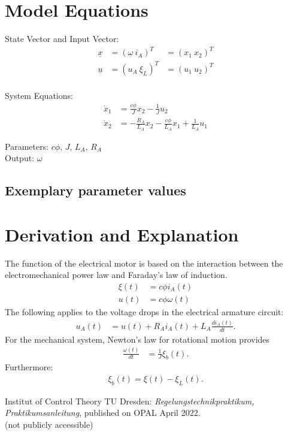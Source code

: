 \documentclass[10pt,a4paper]{article}
\begin{document}
	
	\section{Model Equations} %
	
	State Vector and Input Vector:
	\begin{align*}
		\underline{x} &= (\omega \ i_A)^T &= (x_1 \ x_2)^T \\
		\underline{u} &= (u_A \ \xi_L)^T &= (u_1 \ u_2)^T \\
	\end{align*}
	
	\noindent System Equations:			
	\begin{subequations}
	\begin{align}
		\dot{x}_1 &= \frac{c\phi}{J}x_2 - \frac{1}{J}u_2 \\
		\dot{x}_2 &= -\frac{R_A}{L_A}x_2 - \frac{c\phi}{L_A}x_1 + \frac{1}{L_A}u_1
	\end{align}
	\end{subequations}

	\noindent
	Parameters: $c\phi, \, J, \, L_A, \, R_A$%
	\\
	Output: $\omega$ \\ %
	

	
	\subsection{Exemplary parameter values}
	

	
	\section{Derivation and Explanation} %
	The function of the electrical motor is based on the interaction between the electromechanical power law and Faraday's law of induction.
	\begin{align}
		\xi (t) &= c\phi i_A(t) \\
		u(t) &= c\phi \omega(t)
	\end{align}
	The following applies to the voltage drops in the electrical armature circuit: 
	\begin{align}
		u_A(t) &= u(t) + R_A i_A(t) + L_A\frac{di_A(t)}{dt}. 
	\end{align}
	For the mechanical system, Newton's law for rotational motion provides
	\begin{align}
		\frac{\omega(t)}{dt} &= \frac{1}{J}\xi_b(t). 
	\end{align}
	Furthermore: 
	\begin{align}
		\xi_b(t) = \xi(t) - \xi_L(t). 
	\end{align}
	
	\begin{thebibliography}{10}		
		Institut of Control Theory TU Dresden: 
		\textit{Regelungstechnikpraktikum, Praktikumsanleitung}, published on OPAL April 2022. \\
		(not publicly accessible)
	\end{thebibliography}
\end{document}
